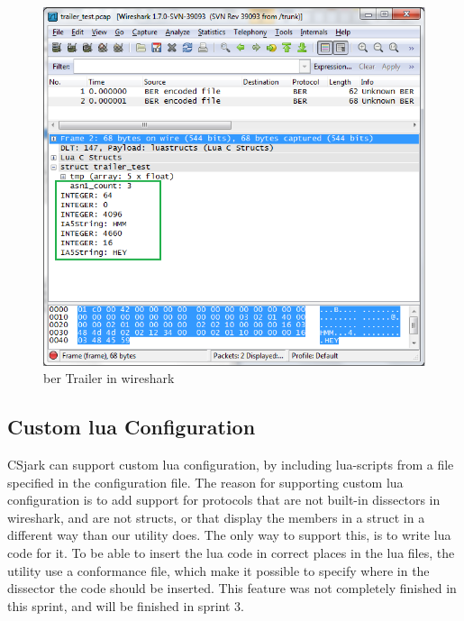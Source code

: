 \begin{figure}[htb]
	\center
	\includegraphics[width=\textwidth]{./sprints/img/wireshark_trailer}
	\caption{\gls{ber} Trailer in \Gls{wireshark}\label{fig:wstrailer}}
\end{figure}





\subsection{Custom \Gls{lua} Configuration}
CSjark can support custom \Gls{lua} configuration, by including \Gls{lua}-\glspl{script} from a 
file specified in the configuration file. The reason for supporting custom \Gls{lua} 
configuration is to add support for protocols that are not built-in \glspl{dissector} in \Gls{wireshark}, 
and are not \glspl{struct}, or that display the members in a struct in a different way 
than our utility does. The only way to support this, is to write \Gls{lua} code for 
it. To be able to insert the \Gls{lua} code in correct places in the \Gls{lua} files, the 
utility use a conformance file, which make it possible to specify where in the 
dissector the code should be inserted. This feature was not completely finished 
in this sprint, and will be finished in sprint 3.


